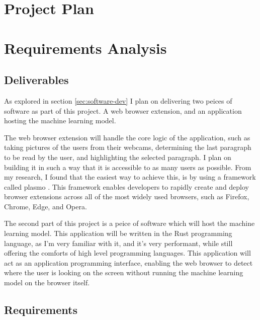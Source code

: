 \documentclass[twocolumn]{report}
\begin{document}
\section{Project Plan}

\section{Requirements Analysis}

\subsection{Deliverables}

As explored in section \ref{sec:software-dev} I plan on delivering two peices of software as part of this project. A web browser extension, and an application hosting the machine learning model. 

The web browser extension will handle the core logic of the application, such as taking pictures of the users from their webcams, determining the last paragraph to be read by the user, and highlighting the selected paragraph. I plan on building it in such a way that it is accessible to as many users as possible. From my research, I found that the easiest way to achieve this, is by using a framework called plasmo \cite{plasmo}. This framework enables developers to rapidly create and deploy browser extensions across all of the most widely used browsers, such as Firefox, Chrome, Edge, and Opera.  

The second part of this project is a peice of software which will host the machine learning model. This application will be written in the Rust programming language, as I'm very familiar with it, and it's very performant, while still offering the comforts of high level programming languages. This application will act as an application programming interface, enabling the web browser to detect where the user is looking on the screen without running the machine learning model on the browser itself. 


\subsection{Requirements}
\end{document}
